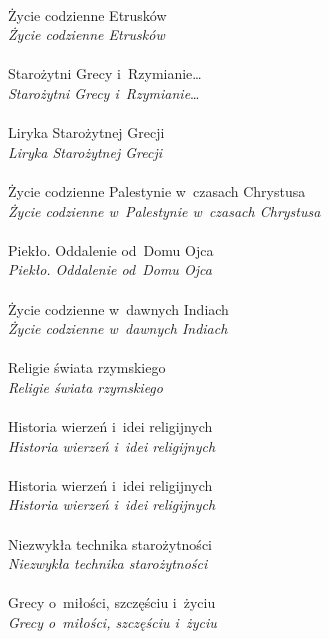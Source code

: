 \documentclass[a4paper,11pt]{article}
\begin{document}
 \\
\Jest  Życie codzienne Etrusków \\
\Powin \textit{Życie codzienne Etrusków} \\
 \\
\Jest  Starożytni Grecy i~Rzymianie\ldots \\
\Powin \textit{Starożytni Grecy i~Rzymianie}\ldots \\
 \\
\Jest  Liryka Starożytnej Grecji \\
\Powin \textit{Liryka Starożytnej Grecji} \\
 \\
\Jest  Życie codzienne Palestynie w~czasach Chrystusa \\
\Powin \textit{Życie codzienne w~Palestynie w~czasach Chrystusa} \\
 \\
\Jest  Piekło. Oddalenie od~Domu Ojca \\
\Powin \textit{Piekło. Oddalenie od~Domu Ojca} \\
 \\
\Jest  Życie codzienne w~dawnych Indiach \\
\Powin \textit{Życie codzienne w~dawnych Indiach} \\
 \\
\Jest  Religie świata rzymskiego \\
\Powin \textit{Religie świata rzymskiego} \\
 \\
\Jest  Historia wierzeń i~idei religijnych \\
\Powin \textit{Historia wierzeń i~idei religijnych} \\
 \\
\Jest  Historia wierzeń i~idei religijnych \\
\Powin \textit{Historia wierzeń i~idei religijnych} \\
 \\
\Jest  Niezwykła technika starożytności \\
\Powin \textit{Niezwykła technika starożytności} \\
 \\
\Jest  Grecy o~miłości, szczęściu i~życiu \\
\Powin \textit{Grecy o~miłości, szczęściu i~życiu} \\
 \\
\end{document}
